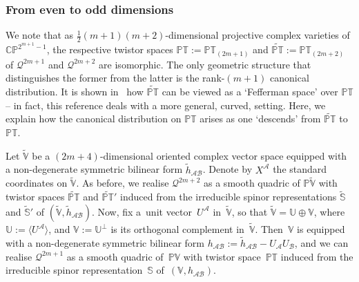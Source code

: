 \documentclass[pdftex]{sigma}
\numberwithin{equation}{section}
\newcommand{\mc} [1]{\mathcal{#1}}
\newcommand{\PT} {\mathbb{PT}}
\newcommand{\Ss} {\mathbb{S}}
\newcommand{\Pp} {\mathbb{P}}
\newcommand{\CP} {\mathbb{CP}}
\newcommand{\V} {\mathbb{V}}
\begin{document}
\subsubsection{From even to odd dimensions}\label{sec-even-odd}
We note that as $\frac{1}{2}(m+1)(m+2)$-dimensional projective complex varieties of $\CP^{2^{m+1}-1}$, the respective twistor spaces $\PT:=\PT_{(2m+1)}$ and $\widetilde{\PT}:=\PT_{(2m+2)}$ of $\mc{Q}^{2m+1}$ and $\mc{Q}^{2m+2}$ are isomorphic. The only geometric structure that distinguishes the former from the latter is the rank-$(m+1)$ canonical distribution. It is shown in~\cite{Doubrov2010} how $\widetilde{\PT}$ can be viewed as a `Fef\/ferman space' over $\PT$ -- in fact, this reference deals with a more general, curved, setting. Here, we explain how the canonical distribution on $\PT$ arises as one `descends' from $\widetilde{\PT}$ to $\PT$.

Let $\widetilde{\V}$ be a $(2m+4)$-dimensional oriented complex vector space equipped with a non-degenerate symmetric bilinear form $\tilde{h}_{\mc{A} \mc{B}}$. Denote by $X^\mc{A}$ the standard coordinates on $\widetilde{\V}$. As before, we realise $\mc{Q}^{2m+2}$ as a smooth quadric of $\Pp \widetilde{\V}$ with twistor spaces $\widetilde{\PT}$ and $\widetilde{\PT}'$ induced from the irreducible spinor representations $\widetilde{\Ss}$ and $\widetilde{\Ss}'$ of $(\widetilde{\V}, \tilde{h}_{\mc{A} \mc{B}})$. Now, f\/ix a~unit vector~$U^\mc{A}$ in~$\widetilde{\V}$, so that $\widetilde{\V} = \mathbb{U} \oplus \V$, where $\mathbb{U} := \langle U^\mc{A} \rangle$, and $\V:=\mathbb{U}^\perp$ is its orthogonal complement in~$\widetilde{\V}$. Then~$\V$ is equipped with a non-degenerate symmetric bilinear form $h_{\mc{A} \mc{B}} := \tilde{h}_{\mc{A} \mc{B}} - U_\mc{A} U_\mc{B}$, and we can realise $\mc{Q}^{2m+1}$ as a smooth quadric of~$\Pp \V$ with twistor space~$\PT$ induced from the irreducible spinor representation~$\Ss$ of~$(\V, h_{\mc{A} \mc{B}})$.
\end{document}
